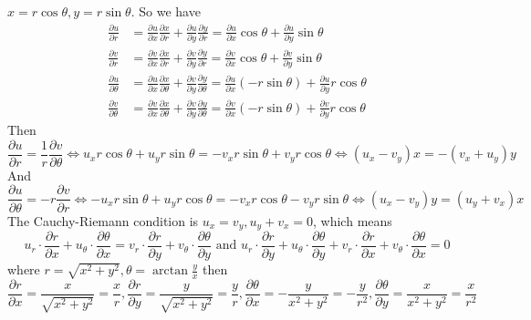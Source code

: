 $x=r\cos\theta,y=r\sin\theta$. So we have
\[
\begin{aligned} 
\frac{ \partial u }{ \partial r }  & =\frac{ \partial u }{ \partial x }\frac{ \partial x }{ \partial r }+\frac{ \partial u }{ \partial y }\frac{ \partial y }{ \partial r } =\frac{ \partial u }{ \partial x } \cos\theta+\frac{ \partial u }{ \partial y } \sin\theta  \\
\frac{ \partial v }{ \partial r }  & =\frac{ \partial v }{ \partial x }\frac{ \partial x }{ \partial r }+\frac{ \partial v }{ \partial y }\frac{ \partial y }{ \partial r }=\frac{ \partial v }{ \partial x } \cos\theta+\frac{ \partial v }{ \partial y } \sin\theta \\
\frac{ \partial u }{ \partial \theta }  & =\frac{ \partial u }{ \partial x } \frac{ \partial x }{ \partial \theta } +\frac{ \partial v }{ \partial y } \frac{ \partial y }{ \partial \theta } =\frac{ \partial u }{ \partial x } (-r\sin\theta)+\frac{ \partial u }{ \partial y } r\cos\theta \\
\frac{ \partial v }{ \partial \theta }  & =\frac{ \partial v }{ \partial x } \frac{ \partial x }{ \partial \theta } +\frac{ \partial v }{ \partial y } \frac{ \partial y }{ \partial \theta } =\frac{ \partial v }{ \partial x } (-r\sin\theta)+\frac{ \partial v }{ \partial y } r\cos\theta
\end{aligned}
\]
Then
\[
\frac{ \partial u }{ \partial r } =\frac{1}{r}\frac{ \partial v }{ \partial \theta } \iff u_{x}r\cos\theta+u_{y}r\sin\theta=-v_{x}r\sin\theta+v_{y}r\cos\theta \iff(u_{x}-v_{y})x=-(v_{x}+u_{y})y
\]
And
\[
\frac{ \partial u }{ \partial \theta } =-r\frac{ \partial v }{ \partial r } \iff-u_{x}r\sin\theta+u_{y}r\cos\theta=-v_{x}r\cos\theta-v_{y}r\sin\theta \iff(u_{x}-v_{y})y=(u_{y}+v_{x})x
\]
The Cauchy-Riemann condition is $u_{x}=v_{y},u_{y}+v_{x}=0$, which means
\[
u_{r}\cdot \frac{ \partial r }{ \partial x } +u_{\theta}\cdot \frac{ \partial \theta }{ \partial x } =v_{r}\cdot \frac{ \partial r }{ \partial y }+v_{\theta}\cdot \frac{ \partial \theta }{ \partial y }\text{ and }u_{r}\cdot \frac{ \partial r }{ \partial y } +u_{\theta}\cdot \frac{ \partial \theta }{ \partial y } +v_{r}\cdot \frac{ \partial r }{ \partial x }+v_{\theta}\cdot \frac{ \partial \theta }{ \partial x }=0
\]
where $r=\sqrt{ x^{2}+y^{2} },\theta=\arctan \frac{y}{x}$ then
\[
\frac{ \partial r }{ \partial x }=\frac{x}{\sqrt{ x^{2}+y^{2} }}=\frac{x}{r},\frac{ \partial r }{ \partial y }=\frac{y}{\sqrt{ x^{2}+y^{2} }}=\frac{y}{r},\frac{ \partial \theta }{ \partial x } =-\frac{y}{x^{2}+y^{2}}=-\frac{y}{r^{2}} ,\frac{ \partial \theta }{ \partial y } =\frac{x}{x^{2}+y^{2}}=\frac{x}{r^{2}} 
\]
